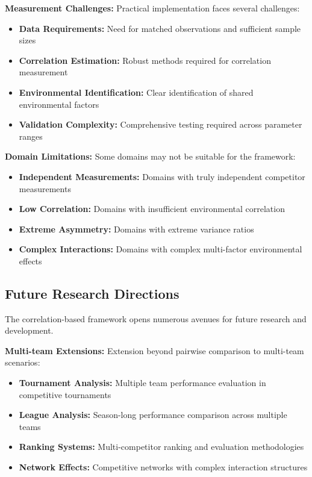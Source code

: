 \textbf{Measurement Challenges:}
Practical implementation faces several challenges:
\begin{itemize}
    \item \textbf{Data Requirements:} Need for matched observations and sufficient sample sizes
    \item \textbf{Correlation Estimation:} Robust methods required for correlation measurement
    \item \textbf{Environmental Identification:} Clear identification of shared environmental factors
    \item \textbf{Validation Complexity:} Comprehensive testing required across parameter ranges
\end{itemize}

\textbf{Domain Limitations:}
Some domains may not be suitable for the framework:
\begin{itemize}
    \item \textbf{Independent Measurements:} Domains with truly independent competitor measurements
    \item \textbf{Low Correlation:} Domains with insufficient environmental correlation
    \item \textbf{Extreme Asymmetry:} Domains with extreme variance ratios
    \item \textbf{Complex Interactions:} Domains with complex multi-factor environmental effects
\end{itemize}

\subsection{Future Research Directions}

The correlation-based framework opens numerous avenues for future research and development.

\textbf{Multi-team Extensions:}
Extension beyond pairwise comparison to multi-team scenarios:
\begin{itemize}
    \item \textbf{Tournament Analysis:} Multiple team performance evaluation in competitive tournaments
    \item \textbf{League Analysis:} Season-long performance comparison across multiple teams
    \item \textbf{Ranking Systems:} Multi-competitor ranking and evaluation methodologies
    \item \textbf{Network Effects:} Competitive networks with complex interaction structures
\end{itemize}

